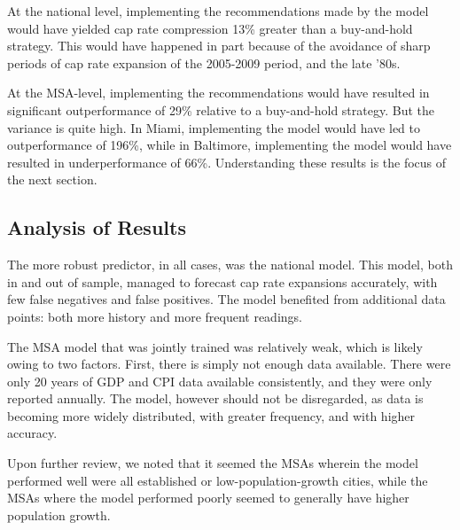 At the national level, implementing the recommendations made by the model would have yielded cap rate compression 13\% greater than a buy-and-hold strategy. This would have happened in part because of the avoidance of sharp periods of cap rate expansion of the 2005-2009 period, and the late '80s.

At the MSA-level, implementing the recommendations would have resulted in significant outperformance of 29\% relative to a buy-and-hold strategy. But the variance is quite high. In Miami, implementing the model would have led to outperformance of 196\%, while in Baltimore, implementing the model would have resulted in underperformance of 66\%. Understanding these results is the  focus of the next section.

\pagebreak

\subsection{Analysis of Results}

The more robust predictor, in all cases, was the national model. This model, both in and out of sample, managed to forecast cap rate expansions accurately, with few false negatives and false positives. The model benefited from additional data points: both more history and more frequent readings. 

The MSA model that was jointly trained was relatively weak, which is likely owing to two factors. First, there is simply not enough data available. There were only 20 years of GDP and CPI data available consistently, and they were only reported annually. The model, however should not be disregarded, as data is becoming more widely distributed, with greater frequency, and with higher accuracy.

Upon further review, we noted that it seemed the MSAs wherein the model performed well were all established or low-population-growth cities, while the MSAs where the model performed poorly seemed to generally have higher population growth. 


